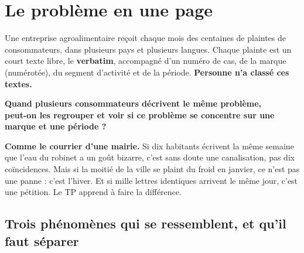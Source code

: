 
\section{Le problème en une page}

Une entreprise agroalimentaire reçoit chaque mois des centaines de plaintes de consommateurs, dans
plusieurs pays et plusieurs langues. Chaque plainte est un court texte libre, le \textbf{verbatim},
accompagné d'un numéro de cas, de la marque (numérotée), du segment d'activité et de la période.
\textbf{Personne n'a classé ces textes.}

\begin{tcolorbox}[colback=notebg,colframe=sectioncolor,arc=3pt,halign=center,boxrule=1.5pt]
{\Large\faSearch\quad\bfseries Quand plusieurs consommateurs décrivent le même problème,}\\[2pt]
{\Large\bfseries peut-on les \textcolor{accentblue}{regrouper} et voir si ce problème se
\textcolor{accentblue}{concentre} sur une marque et une période ?}
\end{tcolorbox}

\begin{enfant}
\textbf{Comme le courrier d'une mairie.} Si dix habitants écrivent la même semaine que l'eau du robinet
a un goût bizarre, c'est sans doute une canalisation, pas dix coïncidences. Mais si la moitié de la
ville se plaint du froid en janvier, ce n'est pas une panne : c'est l'hiver. Et si mille lettres
identiques arrivent le même jour, c'est une pétition. Le TP apprend à faire la différence.
\end{enfant}

\subsection{Trois phénomènes qui se ressemblent, et qu'il faut séparer}

